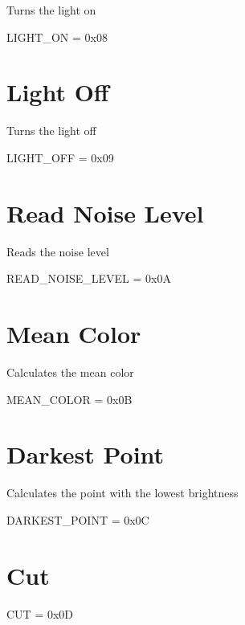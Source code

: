 Turns the light on\par
 L\-I\-G\-H\-T\-\_\-\-O\-N = 0x08\hypertarget{cmd_doc_LightOff}{}\section{Light Off}\label{cmd_doc_LightOff}
Turns the light off\par
 L\-I\-G\-H\-T\-\_\-\-O\-F\-F = 0x09\hypertarget{cmd_doc_ReadNoiseLevel}{}\section{Read Noise Level}\label{cmd_doc_ReadNoiseLevel}
Reads the noise level\par
 R\-E\-A\-D\-\_\-\-N\-O\-I\-S\-E\-\_\-\-L\-E\-V\-E\-L = 0x0\-A\hypertarget{cmd_doc_MeanColor}{}\section{Mean Color}\label{cmd_doc_MeanColor}
Calculates the mean color\par
 M\-E\-A\-N\-\_\-\-C\-O\-L\-O\-R = 0x0\-B\hypertarget{cmd_doc_DarkestPoint}{}\section{Darkest Point}\label{cmd_doc_DarkestPoint}
Calculates the point with the lowest brightness\par
 D\-A\-R\-K\-E\-S\-T\-\_\-\-P\-O\-I\-N\-T = 0x0\-C\hypertarget{cmd_doc_Cut}{}\section{Cut}\label{cmd_doc_Cut}
C\-U\-T = 0x0\-D 
